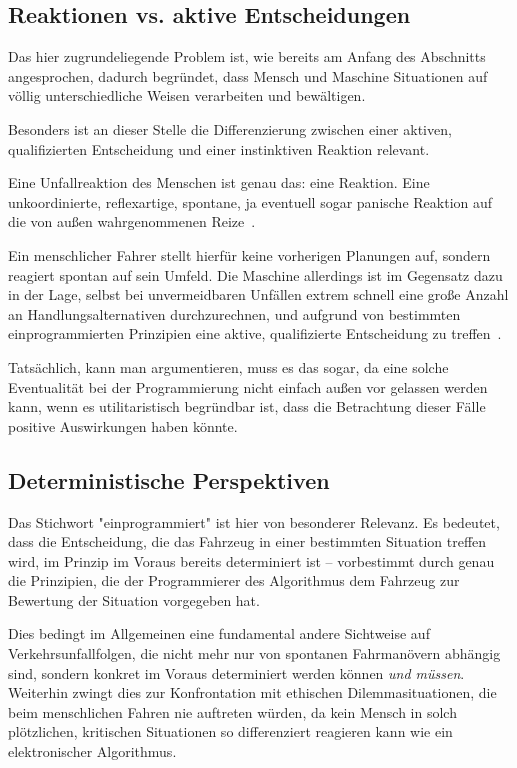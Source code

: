 \documentclass[twocolumn, german]{tum-article}
\begin{document}
\subsection{Reaktionen vs. aktive Entscheidungen}
Das hier zugrundeliegende Problem ist, wie bereits am Anfang des Abschnitts angesprochen, dadurch begründet, dass Mensch und Maschine Situationen auf völlig unterschiedliche Weisen verarbeiten und bewältigen.

Besonders ist an dieser Stelle die Differenzierung zwischen einer aktiven, qualifizierten Entscheidung und einer instinktiven Reaktion relevant.

Eine Unfallreaktion des Menschen ist genau das: eine Reaktion.
Eine unkoordinierte, reflexartige, spontane, ja eventuell sogar panische Reaktion auf die von außen wahrgenommenen Reize~\cite{maurer-autonomous}.

Ein menschlicher Fahrer stellt hierfür keine vorherigen Planungen auf, sondern reagiert spontan auf sein Umfeld.
Die Maschine allerdings ist im Gegensatz dazu in der Lage, selbst bei unvermeidbaren Unfällen extrem schnell eine große Anzahl an Handlungsalternativen durchzurechnen, und aufgrund von bestimmten einprogrammierten Prinzipien eine aktive, qualifizierte Entscheidung zu treffen~\cite[S. 1278]{nyholm-ethics}.

Tatsächlich, kann man argumentieren, muss es das sogar, da eine solche Eventualität bei der Programmierung nicht einfach außen vor gelassen werden kann, wenn es utilitaristisch begründbar ist, dass die Betrachtung dieser Fälle positive Auswirkungen haben könnte.


\subsection{Deterministische Perspektiven}
Das Stichwort "einprogrammiert" ist hier von besonderer Relevanz.
Es bedeutet, dass die Entscheidung, die das Fahrzeug in einer bestimmten Situation treffen wird, im Prinzip im Voraus bereits determiniert ist -- vorbestimmt durch genau die Prinzipien, die der Programmierer des Algorithmus dem Fahrzeug zur Bewertung der Situation vorgegeben hat. 

Dies bedingt im Allgemeinen eine fundamental andere Sichtweise auf Verkehrsunfallfolgen, die nicht mehr nur von spontanen Fahrmanövern abhängig sind, sondern konkret im Voraus determiniert werden können \textit{und müssen}.
Weiterhin zwingt dies zur Konfrontation mit ethischen Dilemmasituationen, die beim menschlichen Fahren nie auftreten würden, da kein Mensch in solch plötzlichen, kritischen Situationen so differenziert reagieren kann wie ein elektronischer Algorithmus.
\end{document}
